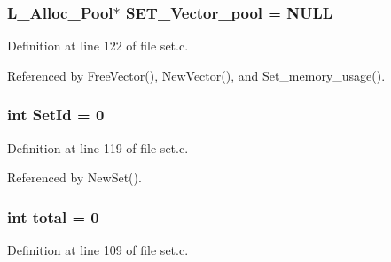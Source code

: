 \subsubsection{\setlength{\rightskip}{0pt plus 5cm}\bf{L\_\-Alloc\_\-Pool}$\ast$ \bf{SET\_\-Vector\_\-pool} = NULL}\label{set_8c_a27e3a043902e17aab715c33e7524218}




Definition at line 122 of file set.c.

Referenced by Free\-Vector(), New\-Vector(), and Set\_\-memory\_\-usage().
\subsubsection{\setlength{\rightskip}{0pt plus 5cm}int \bf{Set\-Id} = 0}\label{set_8c_417d8b045679901384705e4ad6db6c53}




Definition at line 119 of file set.c.

Referenced by New\-Set().
\subsubsection{\setlength{\rightskip}{0pt plus 5cm}int \bf{total} = 0}\label{set_8c_c7af894858cf396a219d632f40afdc8d}




Definition at line 109 of file set.c.